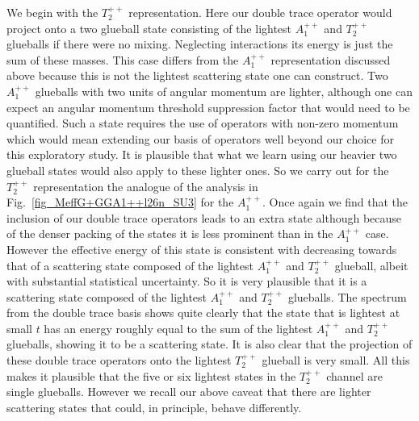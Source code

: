 \documentclass[12pt]{article}
\begin{document}
We begin with the $T_2^{++}$ representation. Here our double trace operator
would project onto a two glueball state consisting of the lightest $A_1^{++}$
and $T_2^{++}$ glueballs if there were no mixing. Neglecting interactions
its energy is just the sum of these masses. This case differs from the $A_1^{++}$
representation discussed above because this is not the lightest scattering state
one can construct. Two $A_1^{++}$ glueballs with two units of angular momentum
are lighter, although one can expect an angular momentum threshold suppression
factor that would need to be quantified. Such a state requires the use of operators
with non-zero momentum which would mean extending our basis of operators well beyond
our choice for this exploratory study. It is plausible that what we learn using
our heavier two glueball states would also apply to these lighter ones. So
we carry out for the $T_2^{++}$ representation the analogue of the analysis
in Fig.~\ref{fig_MeffG+GGA1++l26n_SU3} for the $A_1^{++}$. Once again we find
that the inclusion of our double trace operators leads to an extra state
although because of the denser packing of the states it is less
prominent than in the  $A_1^{++}$ case. However the effective energy of this state is
consistent with decreasing towards that of a scattering state composed of the lightest
$A_1^{++}$ and $T_2^{++}$  glueball, albeit with substantial statistical uncertainty.
So it is very plausible that it is a scattering state composed of the lightest  $A_1^{++}$
and $T_2^{++}$ glueballs.
The spectrum from the double trace basis
shows quite clearly that the state that is lightest at small $t$ has an energy
roughly equal to the sum of the lightest $A_1^{++}$ and $T_2^{++}$ glueballs, showing
it to be a scattering state. It is also clear that the projection of these
double trace operators onto the lightest $T_2^{++}$ glueball is very small.
All this makes it plausible that the five or six lightest states in the $T_2^{++}$ channel
are single glueballs. However we recall our above caveat that there are lighter scattering
states that could, in principle, behave differently.
\end{document}
